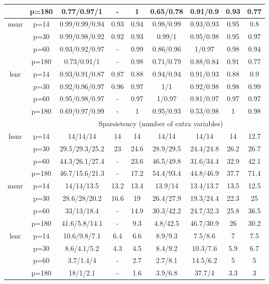 \begin{table}[ht]
{\begin{tabular}{|c|c|ccccccc|}
   & p=180 & 0.77/0.97/1 & - & 1 & 0.65/0.78 & 0.91/0.9 & 0.93 & 0.77 \\ 
  \midrule\multirow{4}[2]{*}{msnr} & p=14 & 0.99/0.99/0.94 & 0.93 & 0.94 & 0.98/0.99 & 0.93/0.93 & 0.95 & 0.8 \\ 
   & p=30 & 0.99/0.98/0.92 & 0.92 & 0.93 & 0.99/1 & 0.95/0.98 & 0.95 & 0.97 \\ 
   & p=60 & 0.93/0.92/0.97 & - & 0.99 & 0.86/0.96 & 1/0.97 & 0.98 & 0.94 \\ 
   & p=180 & 0.73/0.91/1 & - & 0.98 & 0.71/0.79 & 0.88/0.84 & 0.91 & 0.77 \\ 
  \midrule\multirow{4}[2]{*}{lsnr} & p=14 & 0.93/0.91/0.87 & 0.87 & 0.88 & 0.94/0.94 & 0.91/0.93 & 0.88 & 0.9 \\ 
   & p=30 & 0.92/0.96/0.97 & 0.96 & 0.97 & 1/1 & 0.92/0.98 & 0.98 & 0.99 \\ 
   & p=60 & 0.95/0.98/0.97 & - & 0.97 & 1/0.97 & 0.81/0.97 & 0.97 & 0.97 \\ 
   & p=180 & 0.69/0.97/0.99 & - & 1 & 0.95/0.93 & 0.53/0.98 & 1 & 0.98 \\ 
   \midrule 
 \multicolumn{1}{|c}{} &       & \multicolumn{7}{c|}{Sparsistency (number of extra variables)} \\
\midrule\multirow{4}[2]{*}{hsnr} & p=14 & 14/14/14 & 14 & 14 & 14/14 & 14/14 & 14 & 12.7 \\ 
   & p=30 & 29.5/29.3/25.2 & 23 & 24.6 & 28.9/29.5 & 24.4/24.8 & 26.2 & 26.7 \\ 
   & p=60 & 44.3/26.1/27.4 & - & 23.6 & 46.5/49.8 & 31.6/34.4 & 32.9 & 42.1 \\ 
   & p=180 & 46.7/15.6/21.3 & - & 17.2 & 54.4/93.4 & 44.8/46.9 & 37.7 & 71.4 \\ 
  \midrule\multirow{4}[2]{*}{msnr} & p=14 & 14/14/13.5 & 13.2 & 13.4 & 13.9/14 & 13.4/13.7 & 13.5 & 12.5 \\ 
   & p=30 & 28.6/28/20.2 & 16.6 & 19 & 26.4/27.9 & 19.3/24.4 & 22.3 & 25 \\ 
   & p=60 & 33/13/18.4 & - & 14.9 & 30.3/42.2 & 24.7/32.3 & 25.8 & 36.5 \\ 
   & p=180 & 41.6/5.8/14.1 & - & 9.3 & 4.8/42.5 & 46.7/30.9 & 26 & 30.2 \\ 
  \midrule\multirow{4}[2]{*}{lsnr} & p=14 & 10.6/9.8/7.1 & 6.4 & 6.6 & 8.9/9.3 & 7.5/8.6 & 7 & 7.5 \\ 
   & p=30 & 8.6/4.1/5.2 & 4.3 & 4.5 & 8.4/9.2 & 10.3/7.6 & 5.9 & 6.7 \\ 
   & p=60 & 3.7/1.4/4 & - & 2.7 & 2.7/8.1 & 14.5/6.2 & 5 & 5 \\ 
   & p=180 & 18/1/2.1 & - & 1.6 & 3.9/6.8 & 37.7/4 & 3.3 & 3 \\ 
   \bottomrule 
\end{tabular}
}
\end{table}
